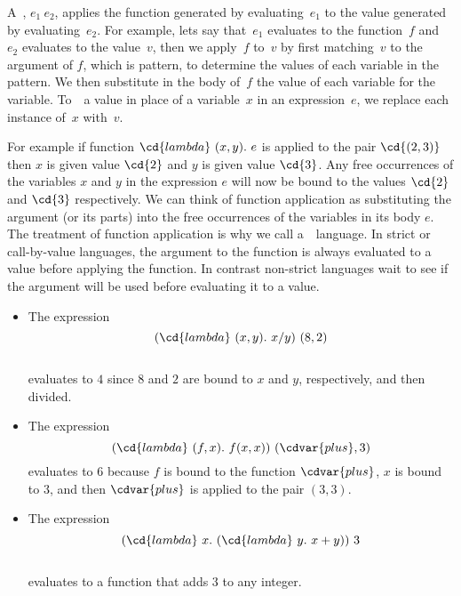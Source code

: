 \begin{gram}
A~, $e_1~e_2$, applies the function
generated by evaluating~$e_1$ to the value generated by
evaluating~$e_2$.  
%
For example, lets say that~$e_1$ evaluates to the function~$f$
and~$e_2$ evaluates to the value~$v$, then we apply~$f$ to~$v$ by
first matching~$v$ to the argument of $f$, which is pattern, to
determine the values of each variable in the pattern.
%
We then substitute in the body of~$f$ the value of each variable for
the variable.  To~~a value in place of a variable~$x$
in an expression~$e$, we replace each instance of~$x$ with~$v$.
%

For example if function $\cd{lambda}~(x,y).~e$ is applied to the pair
$\cd{(2,3)}$ then $x$ is given value $\cd{2}$ and $y$ is given value
$\cd{3}$. 
%
Any free occurrences of the variables $x$ and $y$ in the
expression $e$ will now be bound to the values $\cd{2}$ and $\cd{3}$
respectively.  
%
We can think of function application as substituting
the argument (or its parts) into the free occurrences of the variables
in its body $e$.
%
The treatment of function application is why we call \pml{} a~~language. 
%
In strict or call-by-value languages, the argument to the function is
always evaluated to a value before applying the function.
%
In contrast non-strict languages wait to see if the argument will be
used before evaluating it to a value. 
% 
\end{gram}

\begin{example}
\begin{itemize}

\item
The expression
\[
(\cd{lambda}~(x,y).~x / y)~(8,2)
\]
\\
evaluates to $4$ since $8$ and 
$2$ are bound to $x$ and $y$, respectively, and then divided.

\item
The expression 
\[
(\cd{lambda}~(f,x).~f(x,x))~(\cdvar{plus},3)
\] 
%
evaluates to $6$ because $f$ is bound to the function
$\cdvar{plus}$, $x$ is bound to $3$, and then $\cdvar{plus}$ is applied
to the pair $(3,3)$.

\item
The expression
\[
(\cd{lambda}~x.~(\cd{lambda}~y .~x + y ) )~3
\]
\\
%
evaluates to a function that adds $3$ to any integer.
\end{itemize}
\end{example}

